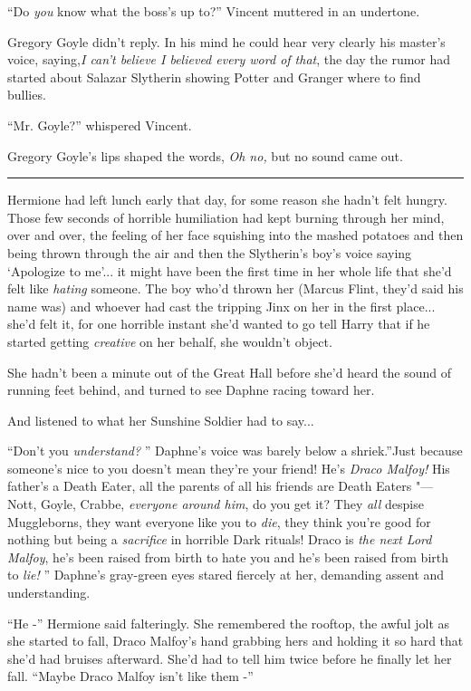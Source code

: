 ``Do \emph{you} know what the boss's up to?'' Vincent muttered in an
undertone.

Gregory Goyle didn't reply. In his mind he could hear very clearly his
master's voice, saying,\emph{I can't believe I believed every word of
that}, the day the rumor had started about Salazar Slytherin showing
Potter and Granger where to find bullies.

``Mr. Goyle?'' whispered Vincent.

Gregory Goyle's lips shaped the words, \emph{Oh no,} but no sound came
out.

\begin{center}\rule{3in}{0.4pt}\end{center}

Hermione had left lunch early that day, for some reason she hadn't felt
hungry. Those few seconds of horrible humiliation had kept burning
through her mind, over and over, the feeling of her face squishing into
the mashed potatoes and then being thrown through the air and then the
Slytherin's boy's voice saying `Apologize to me'... it might have
been the first time in her whole life that she'd felt like \emph{hating}
someone. The boy who'd thrown her (Marcus Flint, they'd said his name
was) and whoever had cast the tripping Jinx on her in the first
place... she'd felt it, for one horrible instant she'd wanted to go
tell Harry that if he started getting \emph{creative} on her behalf, she
wouldn't object.

She hadn't been a minute out of the Great Hall before she'd heard the
sound of running feet behind, and turned to see Daphne racing toward
her.

And listened to what her Sunshine Soldier had to say...

``Don't you \emph{understand?} '' Daphne's voice was barely below a
shriek.''Just because someone's nice to you doesn't mean they're your
friend! He's \emph{Draco Malfoy!} His father's a Death Eater, all the
parents of all his friends are Death Eaters "--- Nott, Goyle, Crabbe,
\emph{everyone around him}, do you get it? They \emph{all} despise
Muggleborns, they want everyone like you to \emph{die}, they think
you're good for nothing but being a \emph{sacrifice} in horrible Dark
rituals! Draco is \emph{the next Lord Malfoy}, he's been raised from
birth to hate you and he's been raised from birth to \emph{lie!} ''
Daphne's gray-green eyes stared fiercely at her, demanding assent and
understanding.

``He -'' Hermione said falteringly. She remembered the rooftop, the
awful jolt as she started to fall, Draco Malfoy's hand grabbing hers and
holding it so hard that she'd had bruises afterward. She'd had to tell
him twice before he finally let her fall. ``Maybe Draco Malfoy isn't
like them -''


